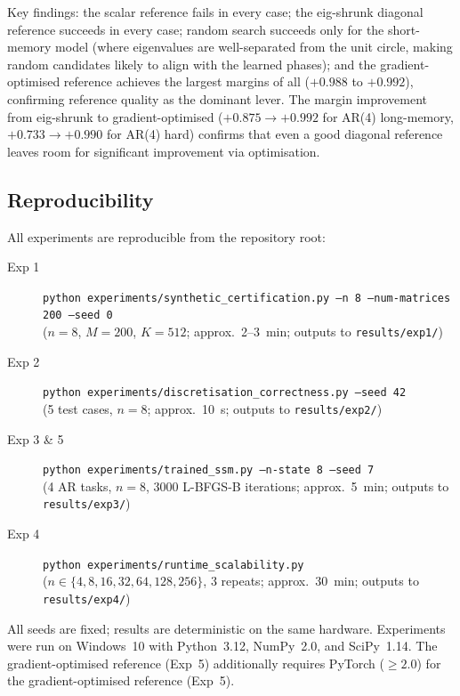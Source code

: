 \documentclass{article}
\theoremstyle{definition}
\begin{document}
Key findings: the scalar reference fails in every case; the eig-shrunk
diagonal reference succeeds in every case; random search succeeds only for
the short-memory model (where eigenvalues are well-separated from the unit
circle, making random candidates likely to align with the learned phases);
and the gradient-optimised reference achieves the largest margins of all
($+0.988$ to $+0.992$), confirming reference quality as the dominant lever.
The margin improvement from eig-shrunk to gradient-optimised ($+0.875 \to
+0.992$ for AR(4) long-memory, $+0.733 \to +0.990$ for AR(4) hard) confirms
that even a good diagonal reference leaves room for significant improvement
via optimisation.

\subsection{Reproducibility}
\label{sec:repro}

All experiments are reproducible from the repository root:

\begin{description}
  \item[Exp 1] \texttt{python experiments/synthetic\_certification.py
    --n 8 --num-matrices 200 --seed 0}\\
    ($n=8$, $M=200$, $K=512$; approx.\ 2--3~min; outputs to
    \texttt{results/exp1/})
  \item[Exp 2] \texttt{python experiments/discretisation\_correctness.py
    --seed 42}\\
    (5 test cases, $n=8$; approx.\ 10~s; outputs to \texttt{results/exp2/})
  \item[Exp 3 \& 5] \texttt{python experiments/trained\_ssm.py
    --n-state 8 --seed 7}\\
    (4 AR tasks, $n=8$, 3000 L-BFGS-B iterations; approx.\ 5~min; outputs to
    \texttt{results/exp3/})
  \item[Exp 4] \texttt{python experiments/runtime\_scalability.py}\\
    ($n \in \{4,8,16,32,64,128,256\}$, 3 repeats; approx.\ 30~min; outputs to
    \texttt{results/exp4/})
\end{description}

All seeds are fixed; results are deterministic on the same hardware.
Experiments were run on Windows~10 with Python~3.12, NumPy~2.0, and
SciPy~1.14.  The gradient-optimised reference (Exp~5) additionally requires
PyTorch ($\geq 2.0$) for the gradient-optimised reference (Exp~5).
\end{document}
